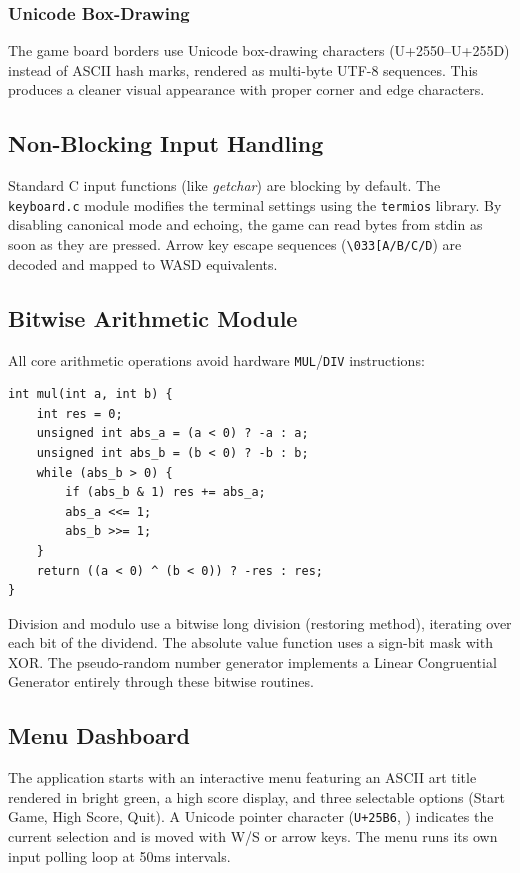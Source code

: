 \documentclass[conference]{IEEEtran}
\begin{document}
\subsubsection{Unicode Box-Drawing}
The game board borders use Unicode box-drawing characters (U+2550--U+255D) instead of ASCII hash marks, rendered as multi-byte UTF-8 sequences. This produces a cleaner visual appearance with proper corner and edge characters.

\subsection{Non-Blocking Input Handling}
Standard C input functions (like \textit{getchar}) are blocking by default. The \texttt{keyboard.c} module modifies the terminal settings using the \texttt{termios} library. By disabling canonical mode and echoing, the game can read bytes from stdin as soon as they are pressed. Arrow key escape sequences (\texttt{\textbackslash 033[A/B/C/D}) are decoded and mapped to WASD equivalents.

\subsection{Bitwise Arithmetic Module}
All core arithmetic operations avoid hardware \texttt{MUL}/\texttt{DIV} instructions:

\begin{lstlisting}[caption=Shift-and-Add Multiplication]
int mul(int a, int b) {
    int res = 0;
    unsigned int abs_a = (a < 0) ? -a : a;
    unsigned int abs_b = (b < 0) ? -b : b;
    while (abs_b > 0) {
        if (abs_b & 1) res += abs_a;
        abs_a <<= 1;
        abs_b >>= 1;
    }
    return ((a < 0) ^ (b < 0)) ? -res : res;
}
\end{lstlisting}

Division and modulo use a bitwise long division (restoring method), iterating over each bit of the dividend. The absolute value function uses a sign-bit mask with XOR. The pseudo-random number generator implements a Linear Congruential Generator entirely through these bitwise routines.

\subsection{Menu Dashboard}
The application starts with an interactive menu featuring an ASCII art title rendered in bright green, a high score display, and three selectable options (Start Game, High Score, Quit). A Unicode pointer character (\texttt{U+25B6}, \textbf{\guillemotright}) indicates the current selection and is moved with W/S or arrow keys. The menu runs its own input polling loop at 50ms intervals.
\end{document}
